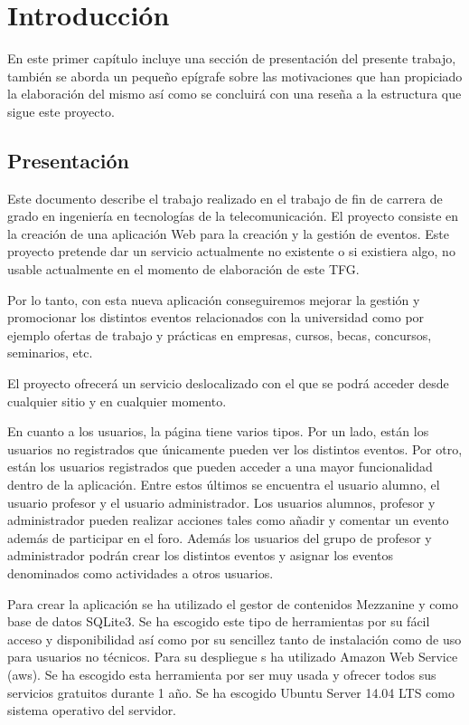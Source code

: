 \chapter{Introducción}
\label{sec:intro}

En este primer capítulo incluye una sección de presentación del presente trabajo, también se aborda un pequeño epígrafe sobre las motivaciones que han propiciado la elaboración del mismo así como se concluirá con una reseña a la estructura que sigue este proyecto.


\section{Presentación}

Este documento describe el trabajo realizado en el trabajo de fin de carrera de grado en ingeniería en tecnologías de la telecomunicación. El proyecto consiste en la creación de una aplicación Web para la creación y la gestión de eventos. Este proyecto pretende dar un servicio actualmente no existente o si existiera algo, no usable actualmente en el momento de elaboración de este TFG.


Por lo tanto, con esta nueva aplicación conseguiremos mejorar la gestión y promocionar los distintos eventos relacionados con la universidad como por ejemplo ofertas de trabajo y prácticas en empresas, cursos, becas, concursos, seminarios, etc.


El proyecto ofrecerá un servicio deslocalizado con el que se podrá acceder desde cualquier sitio y en cualquier  momento. 


En cuanto a los usuarios, la página tiene varios tipos. Por un lado, están los usuarios no registrados que únicamente pueden ver los distintos eventos. Por otro, están los usuarios registrados que pueden acceder a una mayor funcionalidad dentro de la aplicación. Entre estos últimos se encuentra el usuario alumno, el usuario profesor y el usuario administrador. Los usuarios alumnos, profesor y administrador pueden realizar acciones tales como añadir y comentar un evento además de participar en el foro. Además los usuarios del grupo de profesor y administrador podrán crear los distintos eventos y asignar los eventos denominados como actividades a otros usuarios.


Para crear la aplicación se ha utilizado el gestor de contenidos Mezzanine y como base de datos SQLite3. Se ha escogido este tipo de herramientas por su fácil acceso y disponibilidad así como por su sencillez tanto de instalación como de uso para usuarios no técnicos.
Para su despliegue s ha utilizado Amazon Web Service (aws). Se ha escogido esta herramienta por ser muy usada y ofrecer todos sus servicios gratuitos durante 1 año. Se ha escogido Ubuntu Server 14.04 LTS como sistema operativo del servidor.


